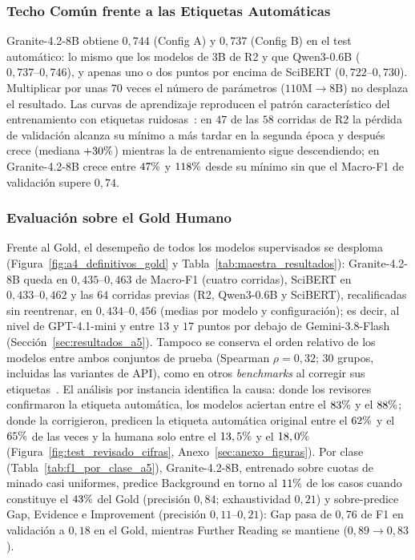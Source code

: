 \documentclass[conference]{IEEEtran}
\newcommand{\pct}{\mbox{\symbol{37}}}
\begin{document}
\subsubsection{Techo Común frente a las Etiquetas Automáticas}

Granite-4.2-8B obtiene $0,744$ (Config A) y $0,737$ (Config B) en el test automático: lo mismo que los modelos de 3B de R2 y que Qwen3-0.6B ($0,737\text{--}0,746$), y apenas uno o dos puntos por encima de SciBERT ($0,722\text{--}0,730$). Multiplicar por unas $70$ veces el número de parámetros ($110\text{M} \to 8\text{B}$) no desplaza el resultado. Las curvas de aprendizaje reproducen el patrón característico del entrenamiento con etiquetas ruidosas~\cite{arpit2017closer}: en $47$ de las $58$ corridas de R2 la pérdida de validación alcanza su mínimo a más tardar en la segunda época y después crece (mediana $+30\pct{}$) mientras la de entrenamiento sigue descendiendo; en Granite-4.2-8B crece entre $47\pct{}$ y $118\pct{}$ desde su mínimo sin que el Macro-F1 de validación supere $0,74$.

\subsubsection{Evaluación sobre el Gold Humano}

Frente al Gold, el desempeño de todos los modelos supervisados se desploma (Figura~\ref{fig:a4_definitivos_gold} y Tabla~\ref{tab:maestra_resultados}): Granite-4.2-8B queda en $0,435\text{--}0,463$ de Macro-F1 (cuatro corridas), SciBERT en $0,433\text{--}0,462$ y las $64$ corridas previas (R2, Qwen3-0.6B y SciBERT), recalificadas sin reentrenar, en $0,434\text{--}0,456$ (medias por modelo y configuración); es decir, al nivel de GPT-4.1-mini y entre $13$ y $17$ puntos por debajo de Gemini-3.8-Flash (Sección~\ref{sec:resultados_a5}). Tampoco se conserva el orden relativo de los modelos entre ambos conjuntos de prueba (Spearman $\rho=0,32$; $30$ grupos, incluidas las variantes de API), como en otros \textit{benchmarks} al corregir sus etiquetas~\cite{northcutt2021pervasive}. El análisis por instancia identifica la causa: donde los revisores confirmaron la etiqueta automática, los modelos aciertan entre el $83\pct{}$ y el $88\pct{}$; donde la corrigieron, predicen la etiqueta automática original entre el $62\pct{}$ y el $65\pct{}$ de las veces y la humana solo entre el $13,5\pct{}$ y el $18,0\pct{}$ (Figura~\ref{fig:test_revisado_cifras}, Anexo~\ref{sec:anexo_figuras}). Por clase (Tabla~\ref{tab:f1_por_clase_a5}), Granite-4.2-8B, entrenado sobre cuotas de minado casi uniformes, predice Background en torno al $11\pct{}$ de los casos cuando constituye el $43\pct{}$ del Gold (precisión $0,84$; exhaustividad $0,21$) y sobre-predice Gap, Evidence e Improvement (precisión $0,11\text{--}0,21$): Gap pasa de $0,76$ de F1 en validación a $0,18$ en el Gold, mientras Further Reading se mantiene ($0,89 \to 0,83$).
\end{document}
